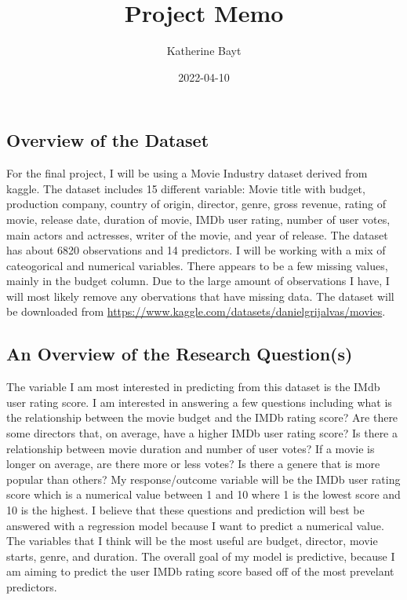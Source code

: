 \documentclass[
]{article}
\title{Project Memo}
\author{Katherine Bayt}
\date{2022-04-10}
\begin{document}
\maketitle

\hypertarget{overview-of-the-dataset}{%
\subsection{Overview of the Dataset}\label{overview-of-the-dataset}}

For the final project, I will be using a Movie Industry dataset derived
from kaggle. The dataset includes 15 different variable: Movie title
with budget, production company, country of origin, director, genre,
gross revenue, rating of movie, release date, duration of movie, IMDb
user rating, number of user votes, main actors and actresses, writer of
the movie, and year of release. The dataset has about 6820 observations
and 14 predictors. I will be working with a mix of cateogorical and
numerical variables. There appears to be a few missing values, mainly in
the budget column. Due to the large amount of observations I have, I
will most likely remove any obervations that have missing data. The
dataset will be downloaded from
\url{https://www.kaggle.com/datasets/danielgrijalvas/movies}.

\hypertarget{an-overview-of-the-research-questions}{%
\subsection{An Overview of the Research
Question(s)}\label{an-overview-of-the-research-questions}}

The variable I am most interested in predicting from this dataset is the
IMdb user rating score. I am interested in answering a few questions
including what is the relationship between the movie budget and the IMDb
rating score? Are there some directors that, on average, have a higher
IMDb user rating score? Is there a relationship between movie duration
and number of user votes? If a movie is longer on average, are there
more or less votes? Is there a genere that is more popular than others?
My response/outcome variable will be the IMDb user rating score which is
a numerical value between 1 and 10 where 1 is the lowest score and 10 is
the highest. I believe that these questions and prediction will best be
answered with a regression model because I want to predict a numerical
value. The variables that I think will be the most useful are budget,
director, movie starts, genre, and duration. The overall goal of my
model is predictive, because I am aiming to predict the user IMDb rating
score based off of the most prevelant predictors.
\end{document}

